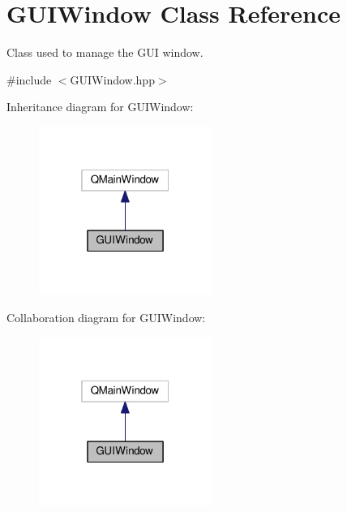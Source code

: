 \hypertarget{class_g_u_i_window}{}\section{G\+U\+I\+Window Class Reference}
\label{class_g_u_i_window}


Class used to manage the G\+UI window.  




{\ttfamily \#include $<$G\+U\+I\+Window.\+hpp$>$}



Inheritance diagram for G\+U\+I\+Window\+:
\nopagebreak
\begin{figure}[H]
\begin{center}
\leavevmode
\includegraphics[width=160pt]{class_g_u_i_window__inherit__graph}
\end{center}
\end{figure}


Collaboration diagram for G\+U\+I\+Window\+:
\nopagebreak
\begin{figure}[H]
\begin{center}
\leavevmode
\includegraphics[width=160pt]{class_g_u_i_window__coll__graph}
\end{center}
\end{figure}
